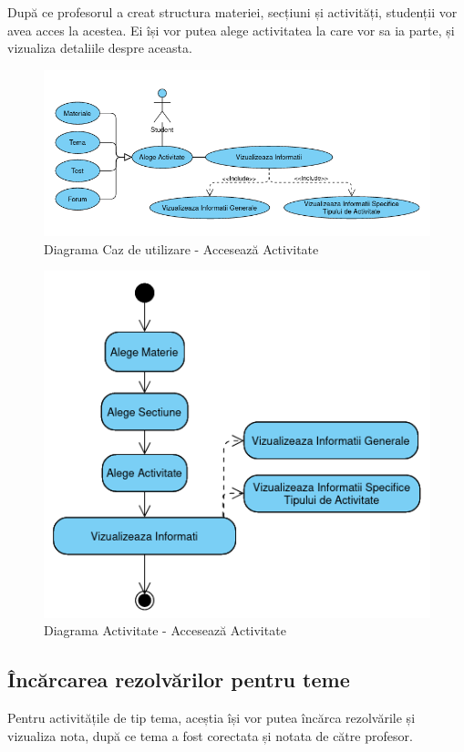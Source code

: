 \documentclass[12pt, a4paper, oneside, romanian]{teza-upb}
\begin{document}
După ce profesorul a creat structura materiei, secțiuni și activități, studenții vor avea acces la acestea. Ei își vor putea alege activitatea la care vor sa ia parte, și vizualiza detaliile despre aceasta.

\begin{figure}[H]
\centering
\includegraphics*[width=\columnwidth]{diagrama-use-case-acceseaza-activitate}
\caption{Diagrama Caz de utilizare - Accesează Activitate}
\label{diagrama-use-case-acceseaza-activitate}
\end{figure}


\begin{figure}[H]
\centering
\includegraphics*[width=0.6\columnwidth]{diagrama-activitate-acceseaza-activitate}
\caption{Diagrama Activitate - Accesează Activitate}
\label{diagrama-activitate-acceseaza-activitate}
\end{figure}

\subsection{Încărcarea rezolvărilor pentru teme}

Pentru activitățile de tip tema, aceștia își vor putea încărca rezolvările și vizualiza nota, după ce tema a fost corectata și notata de către profesor.
\end{document}
